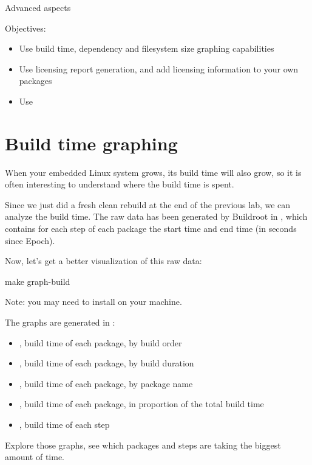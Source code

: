 \subchapter
{Advanced aspects}
{Objectives:
  \begin{itemize}
  \item Use build time, dependency and filesystem size graphing capabilities
  \item Use licensing report generation, and add licensing
    information to your own packages
  \item Use 
  \end{itemize}
}

\section{Build time graphing}

When your embedded Linux system grows, its build time will also grow,
so it is often interesting to understand where the build time is
spent.

Since we just did a fresh clean rebuild at the end of the previous
lab, we can analyze the build time. The raw data has been generated by
Buildroot in , which contains for
each step of each package the start time and end time (in seconds
since Epoch).

Now, let's get a better visualization of this raw data:

\begin{bashinput}
make graph-build
\end{bashinput}

Note: you may need to install  on your machine.

The graphs are generated in :

\begin{itemize}
\item {}, build time of each package, by
  build order
\item {}, build time of each package, by
  build duration
\item {}, build time of each package, by
  package name
\item {}, build time of each package, in
  proportion of the total build time
\item {}, build time of each step
\end{itemize}

Explore those graphs, see which packages and steps are taking the
biggest amount of time.

